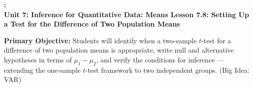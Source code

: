 \documentclass[10pt]{article}
\newcommand{\UnitNumberName}{Unit 7: Inference for Quantitative Data: Means \quad}
\newcommand{\LessonNumberName}{Lesson 7.8: Setting Up a Test for the Difference of Two Population Means}
\begin{document}
\begin{center}
    {\Large\bfseries \CourseName: \SchoolYear \\
    {\small\bfseries \UnitNumberName \LessonNumberName}}
\end{center}

\begin{tcolorbox}[colback=sky, colframe=navy, boxrule=0.9pt, arc=2mm,
    left=2mm, right=2mm, top=1.5mm, bottom=1.5mm]
    \textbf{Primary Objective:} Students will identify when a two-sample $t$-test for a
    difference of two population means is appropriate, write null and alternative hypotheses
    in terms of $\mu_1 - \mu_2$, and verify the conditions for inference --- extending the
    one-sample $t$-test framework to two independent groups. (Big Idea: VAR)
\end{tcolorbox}
\end{document}
